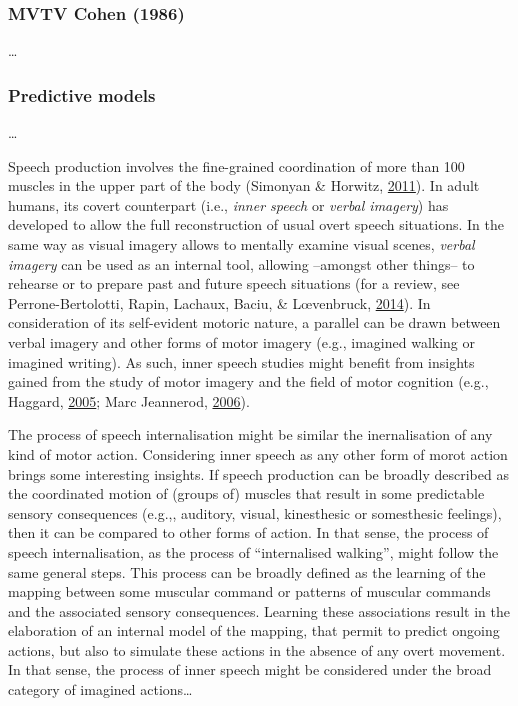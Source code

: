 \documentclass[a4paper,12pt,twoside,openright,oldfontcommands]{memoir}
\begin{document}
\subsubsection{MVTV Cohen (1986)}\label{mvtv-cohen-1986}

\ldots{}

\subsubsection{Predictive models}\label{predictive-models}

\ldots{}

Speech production involves the fine-grained coordination of more than
100 muscles in the upper part of the body (Simonyan \& Horwitz,
\protect\hyperlink{ref-simonyan_laryngeal_2011}{2011}). In adult humans,
its covert counterpart (i.e., \emph{inner speech} or \emph{verbal
imagery}) has developed to allow the full reconstruction of usual overt
speech situations. In the same way as visual imagery allows to mentally
examine visual scenes, \emph{verbal imagery} can be used as an internal
tool, allowing --amongst other things-- to rehearse or to prepare past
and future speech situations (for a review, see Perrone-Bertolotti,
Rapin, Lachaux, Baciu, \& Lœvenbruck,
\protect\hyperlink{ref-Perrone-Bertolotti2014}{2014}). In consideration
of its self-evident motoric nature, a parallel can be drawn between
verbal imagery and other forms of motor imagery (e.g., imagined walking
or imagined writing). As such, inner speech studies might benefit from
insights gained from the study of motor imagery and the field of motor
cognition (e.g., Haggard,
\protect\hyperlink{ref-haggard_conscious_2005}{2005}; Marc Jeannerod,
\protect\hyperlink{ref-jeannerod_motor_2006}{2006}).

The process of speech internalisation might be similar the
inernalisation of any kind of motor action. Considering inner speech as
any other form of morot action brings some interesting insights. If
speech production can be broadly described as the coordinated motion of
(groups of) muscles that result in some predictable sensory consequences
(e.g.,, auditory, visual, kinesthesic or somesthesic feelings), then it
can be compared to other forms of action. In that sense, the process of
speech internalisation, as the process of ``internalised walking'',
might follow the same general steps. This process can be broadly defined
as the learning of the mapping between some muscular command or patterns
of muscular commands and the associated sensory consequences. Learning
these associations result in the elaboration of an internal model of the
mapping, that permit to predict ongoing actions, but also to simulate
these actions in the absence of any overt movement. In that sense, the
process of inner speech might be considered under the broad category of
imagined actions\ldots{}
\end{document}
